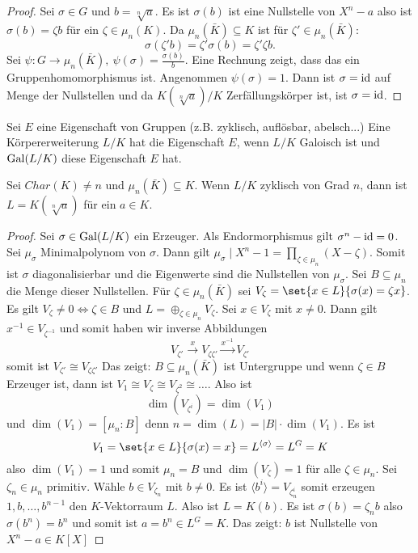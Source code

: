 \begin{proof}
	Sei \(\sigma\in G\) und \(b=\sqrt[n]{a}\). Es ist \(\sigma(b)\) ist eine Nullstelle von \(X^n-a\) also ist \(\sigma(b)=\zeta b\) für ein \(\zeta\in\mu_n(K)\).
	Da \(\mu_n(\bar K)\subseteq K\) ist für \(\zeta'\in\mu_n(\bar K):\)
	\[\sigma(\zeta'b)=\zeta'\sigma(b)=\zeta'\zeta b.\]
	Sei \(\psi\colon G\to \mu_n(\bar K), \ \psi(\sigma)=\frac{\sigma(b)}{b}\). Eine Rechnung zeigt, dass das ein Gruppenhomomorphismus ist. Angenommen \(\psi(\sigma)=1\).
	Dann ist \(\sigma=\mathrm{id}\) auf Menge der Nullstellen und da \(K(\sqrt[n]{a})/K\) Zerfällungskörper ist, ist \(\sigma=\mathrm{id}\).
\end{proof}
\begin{Def}
	Sei \(E\) eine Eigenschaft von Gruppen (z.B. zyklisch, auflösbar, abelsch...) Eine Körpererweiterung \(L/K\) hat die Eigenschaft \(E\), wenn \(L/K\) Galoisch ist und \(\operatorname{Gal}(L/K)\) diese Eigenschaft \(E\) hat.
\end{Def}
\begin{Satz}\label{Satz:ZyklWurzel}
	Sei \(Char(K)\neq n\) und \(\mu_n(\bar K)\subseteq K\). Wenn \(L/K\) zyklisch von Grad \(n\), dann ist \(L=K(\sqrt[n]{a})\) für ein \(a\in K\).
\end{Satz}
\begin{proof}
	Sei \(\sigma\in\operatorname{Gal}(L/K)\) ein Erzeuger. Als Endormorphismus gilt \(\sigma^n-\mathrm{id}=0\). Sei \(\mu_\sigma\) Minimalpolynom von \(\sigma\).
	Dann gilt \(\mu_\sigma\mid X^n-1=\prod_{\zeta\in\mu_n}(X-\zeta)\). Somit ist \(\sigma\) diagonalisierbar und die Eigenwerte sind die Nullstellen von \(\mu_\sigma\). Sei \(B\subseteq \mu_n\) die Menge dieser Nullstellen. Für \(\zeta\in \mu_n(\bar K)\) sei \(V_\zeta=\set{x\in L}{ \sigma(x)=\zeta x}\). Es gilt \(V_\zeta\neq 0\iff \zeta\in B\) und
	\(L=\oplus_{\zeta\in\mu_n}V_\zeta\).
	Sei \(x\in V_\zeta\) mit \(x\neq 0\). Dann gilt \(x^{-1}\in V_{\zeta^{-1}}\) und somit haben wir inverse Abbildungen 
	\[V_{\zeta'}\stackrel{x}\to V_{\zeta\zeta'}\stackrel{x^{-1}}\to V_{\zeta'}\] somit ist \(V_{\zeta'}\cong V_{\zeta\zeta'}\)
	Das zeigt: \(B\subseteq \mu_n(\bar K)\) ist Untergruppe und wenn \(\zeta\in B\) Erzeuger ist, dann  ist \(V_1\cong V_\zeta\cong V_{\zeta^2}\cong\dots\).
	Also ist \[\dim(V_{\zeta^i})=\dim(V_1)\] und \(\dim(V_1)=[\mu_n:B]\) denn \(n=\dim(L)=|B|\cdot \dim(V_1)\).
	Es ist 
	\[V_1=\set{x\in L}{ \sigma(x)=x}=L^{\langle \sigma\rangle}=L^G=K\] also \(\dim(V_1)=1\) und somit \(\mu_n=B\) und \(\dim(V_\zeta)=1\) für alle \(\zeta\in\mu_n\).
	Sei \(\zeta_n\in\mu_n\) primitiv. Wähle \(b\in V_{\zeta_n}\) mit \(b\neq 0\). Es ist \(\langle b^i\rangle=V_{\zeta_n^i}\) somit erzeugen \(1,b,\dots, b^{n-1}\) den \(K\)-Vektorraum \(L\). Also ist \(L=K(b)\).
	Es ist \(\sigma(b)=\zeta_nb\) also \(\sigma(b^n)=b^n\) und somit ist \(a=b^n\in L^G=K\). Das zeigt: \(b\) ist Nullstelle von \(X^n-a\in K[X]\)
\end{proof}
